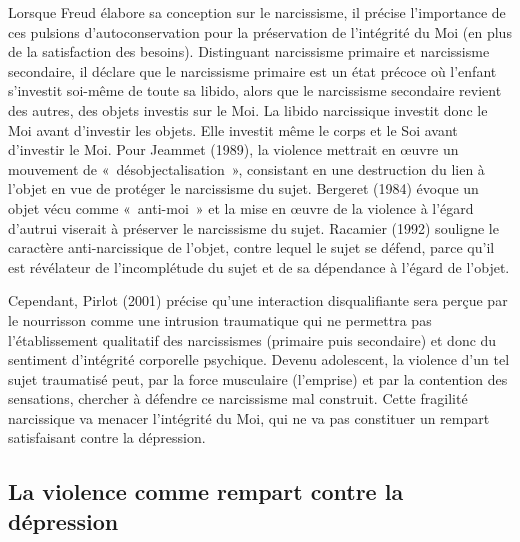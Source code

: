 \documentclass[12pt, a4paper]{book}
\begin{document}
\begin{spacing}{1.5}
Lorsque Freud élabore sa conception sur le narcissisme, il précise l'importance de ces pulsions d'autoconservation pour la préservation de l'intégrité du Moi (en plus de la satisfaction des besoins). Distinguant narcissisme primaire et narcissisme secondaire, il déclare que le narcissisme primaire est un état précoce où l'enfant s'investit soi-même de toute sa libido, alors que le narcissisme secondaire revient des autres, des objets investis sur le Moi. La libido narcissique investit donc le Moi avant d'investir les objets. Elle investit même le corps et le Soi avant d'investir le Moi.                     Pour Jeammet (1989), la violence mettrait en œuvre un mouvement de « désobjectalisation », consistant en une destruction du lien à l'objet en vue de protéger le narcissisme du sujet. Bergeret (1984) évoque un objet vécu comme « anti-moi » et la mise en œuvre de la violence à l'égard d'autrui viserait à préserver le narcissisme du sujet. Racamier (1992) souligne le caractère anti-narcissique de l'objet, contre lequel le sujet se défend, parce qu'il est révélateur de l'incomplétude du sujet et de sa dépendance à l'égard de l'objet.                                                                  

Cependant, Pirlot (2001) précise qu'une interaction disqualifiante sera perçue par le nourrisson comme une intrusion traumatique qui ne permettra pas l'établissement qualitatif des narcissismes (primaire puis secondaire) et donc du sentiment d'intégrité corporelle psychique. Devenu adolescent, la violence d'un tel sujet traumatisé peut, par la force musculaire (l'emprise) et par la contention des sensations, chercher à défendre ce narcissisme mal construit. Cette fragilité narcissique va menacer l'intégrité du Moi, qui ne va pas constituer un rempart satisfaisant contre la dépression.

\subsection{La violence comme rempart contre la dépression}


\end{spacing}
\end{document}
